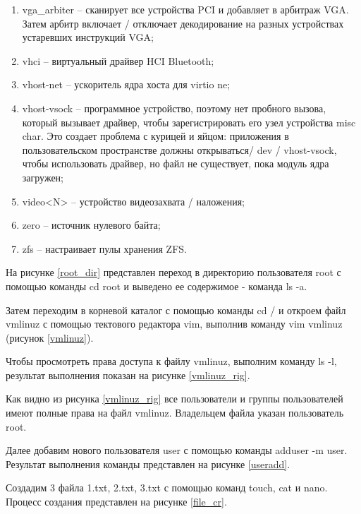 \begin{enumerate}
    \item vga\_arbiter -- сканирует все устройства PCI и добавляет в арбитраж VGA. Затем арбитр включает / отключает декодирование на разных устройствах устаревших инструкций VGA;
    \item vhci -- виртуальный драйвер HCI Bluetooth;
    \item vhost-net -- ускоритель ядра хоста для virtio ne;
    \item vhost-vsock -- программное устройство, поэтому нет пробного вызова, который вызывает драйвер, чтобы зарегистрировать его узел устройства misc char. Это создает проблема с курицей и яйцом: приложения в пользовательском пространстве должны открываться/ dev / vhost-vsock, чтобы использовать драйвер, но файл не существует, пока модуль ядра загружен;
    \item video<N> -- устройство видеозахвата / наложения;
    \item zero -- источник нулевого байта;
    \item zfs -- настраивает пулы хранения ZFS.
\end{enumerate}

На рисунке \ref{root_dir} представлен переход в директорию пользователя root с помощью команды cd root и выведено ее содержимое - команда ls -a.

\newpage
Затем переходим в корневой каталог с помощью команды cd / и откроем файл vmlinuz с помощью тектового редактора vim, выполнив команду vim vmlinuz (рисунок \ref{vmlinuz}).


\newpage
Чтобы просмотреть права доступа к файлу vmlinuz, выполним команду ls -l, результат выполнения показан на рисунке \ref{vmlinuz_rig}.

Как видно из рисунка \ref{vmlinuz_rig} все пользователи и группы пользователей имеют полные права на файл vmlinuz. Владельцем файла указан пользователь root.

Далее добавим нового пользователя user с помощью команды adduser -m user. Результат выполнения команды представлен на рисунке \ref{useradd}.


\newpage
Создадим 3 файла 1.txt, 2.txt, 3.txt с помощью команд touch, cat и nano. Процесс создания представлен на рисунке \ref{file_cr}.

